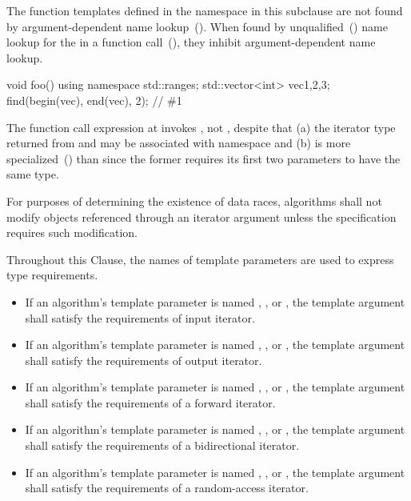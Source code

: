 \begin{addedblock}
\pnum
The function templates defined in the  namespace
in this subclause are not found by argument-dependent
name lookup~(). When found by
unqualified~() name lookup for the
 in a function call~(), they
inhibit argument-dependent name lookup.

\begin{example}
\begin{codeblock}
void foo() {
    using namespace std::ranges;
    std::vector<int> vec{1,2,3};
    find(begin(vec), end(vec), 2); // \#1
}
\end{codeblock}
The function call expression at  invokes ,
not , despite that (a) the iterator type returned from 
and  may be associated with namespace  and (b)
 is more specialized~() than
 since the former requires its first two parameters to
have the same type.
\end{example}
\end{addedblock}

\pnum
For purposes of determining the existence of data races, algorithms shall
not modify objects referenced through an iterator argument unless the
specification requires such modification.

\pnum
Throughout this Clause, 
the names of template parameters are used to express type requirements.
\begin{itemize}
\item
If an algorithm's template parameter is named
,
,
or
,
the template argument shall satisfy the
requirements of  input iterator.
\item
If an algorithm's template parameter is named
,
,
or
,
the template argument shall satisfy the requirements
of  output iterator.
\item
If an algorithm's template parameter is named
,
,
or
,
the template argument shall satisfy the requirements
of a  forward iterator.
\item
If an algorithm's template parameter is named
,
,
or
,
the template argument shall satisfy the requirements
of a  bidirectional iterator.
\item
If an algorithm's template parameter is named
,
,
or
,
the template argument shall satisfy the requirements
of a  random-access iterator.
\end{itemize}

